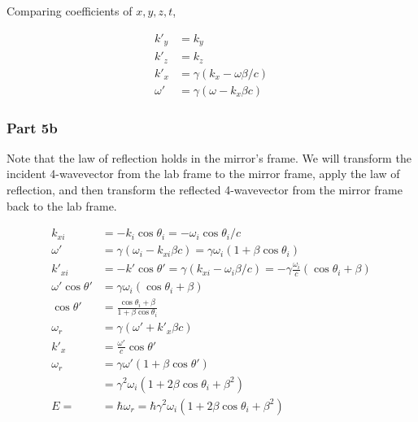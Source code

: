 \documentclass{article}
\begin{document}
Comparing coefficients of $x,y,z,t$,

\begin{align}
    k'_y &= k_y \\
    k'_z &= k_z \\
    k'_x &= \gamma(k_x - \omega\beta/c) \\
    \omega' &= \gamma(\omega - k_x\beta c)
\end{align}

\subsubsection{Part 5b}
Note that the law of reflection holds in the mirror's frame. We will transform the incident 4-wavevector from the lab frame to the mirror frame, apply the law of reflection, and then transform the reflected 4-wavevector from the mirror frame back to the lab frame.

\begin{align}
    k_{xi} &= -k_i\cos\theta_i = -\omega_i \cos\theta_i / c \\
    \omega' &= \gamma(\omega_i - k_{xi}\beta c) = \gamma \omega_i (1+\beta \cos\theta_i) \\
    k'_{xi} &= -k' \cos\theta' = \gamma(k_{xi}-\omega_i \beta / c) = -\gamma \frac{\omega_i}{c} (\cos\theta_i + \beta) \\
    \omega' \cos\theta' &= \gamma \omega_i (\cos\theta_i + \beta) \\
    \cos\theta' &= \frac{\cos\theta_i + \beta}{1+\beta\cos\theta_i} \\
    \omega_r &= \gamma(\omega' + k'_x \beta c) \\
    k'_x &= \frac{\omega'}{c}\cos\theta' \\
    \omega_r &= \gamma \omega' (1+\beta \cos\theta') \\
    &= \gamma^2 \omega_i (1+2\beta\cos\theta_i +\beta^2) \\
    E =&= \hbar \omega_r = \hbar \gamma^2 \omega_i (1+2\beta\cos\theta_i +\beta^2)
\end{align}

\pagebreak
\end{document}
